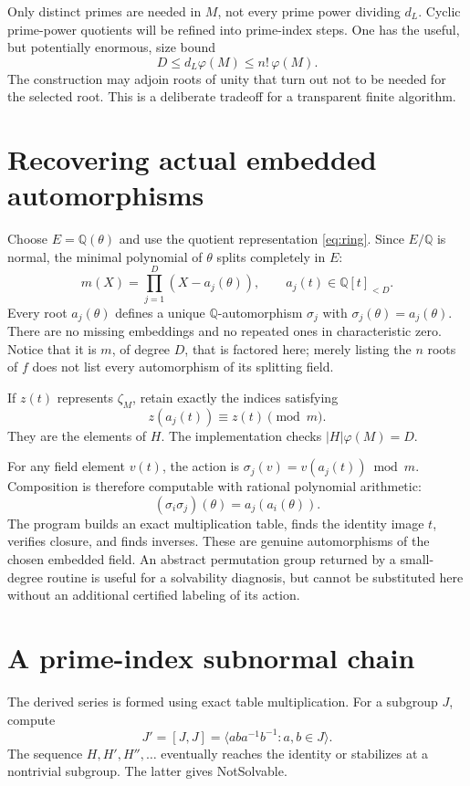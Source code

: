 \documentclass[11pt,letterpaper]{article}
\theoremstyle{definition}\newtheorem{definition}[theorem]{Definition}
\theoremstyle{remark}\newtheorem{remark}[theorem]{Remark}
\newcommand{\Q}{\mathbb Q}
\newcommand{\status}[1]{\textsf{#1}}
\begin{document}
Only distinct primes are needed in $M$, not every prime power dividing
$d_L$. Cyclic prime-power quotients will be refined into prime-index steps.
One has the useful, but potentially enormous, size bound
\begin{equation}\label{eq:sizebound}
 D\leq d_L\varphi(M)\leq n!\,\varphi(M).
\end{equation}
The construction may adjoin roots of unity that turn out not to be needed
for the selected root. This is a deliberate tradeoff for a transparent
finite algorithm.

\section{Recovering actual embedded automorphisms}
\label{sec:automorphisms}
Choose $E=\Q(\theta)$ and use the quotient representation
\eqref{eq:ring}. Since $E/\Q$ is normal, the minimal polynomial of $\theta$
splits completely in $E$:
\[
 m(X)=\prod_{j=1}^D(X-a_j(\theta)),\qquad a_j(t)\in\Q[t]_{<D}.
\]
Every root $a_j(\theta)$ defines a unique $\Q$-automorphism
$\sigma_j$ with $\sigma_j(\theta)=a_j(\theta)$. There are no missing
embeddings and no repeated ones in characteristic zero. Notice that it is
$m$, of degree $D$, that is factored here; merely listing the $n$ roots of
$f$ does not list every automorphism of its splitting field.

If $z(t)$ represents $\zeta_M$, retain exactly the indices satisfying
\begin{equation}\label{eq:fixz}
 z(a_j(t))\equiv z(t)\pmod m.
\end{equation}
They are the elements of $H$. The implementation checks
$|H|\varphi(M)=D$.

For any field element $v(t)$, the action is
$\sigma_j(v)=v(a_j(t))\bmod m$. Composition is therefore computable with
rational polynomial arithmetic:
\begin{equation}\label{eq:composition}
 (\sigma_i\sigma_j)(\theta)
 =a_j(a_i(\theta)).
\end{equation}
The program builds an exact multiplication table, finds the identity image
$t$, verifies closure, and finds inverses. These are genuine automorphisms
of the chosen embedded field. An abstract permutation group returned by a
small-degree routine is useful for a solvability diagnosis, but cannot be
substituted here without an additional certified labeling of its action.

\section{A prime-index subnormal chain}
\label{sec:groups}
The derived series is formed using exact table multiplication. For a
subgroup $J$, compute
\[
 J'=[J,J]=\langle aba^{-1}b^{-1}:a,b\in J\rangle.
\]
The sequence $H,H',H'',\ldots$ eventually reaches the identity or stabilizes
at a nontrivial subgroup. The latter gives \status{NotSolvable}.
\end{document}
